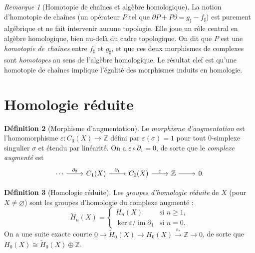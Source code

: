 \documentclass[12pt,a4paper,openany]{book}
\theoremstyle{definition}
\newtheorem{definition}{Définition}[chapter]
\theoremstyle{plain}
\theoremstyle{remark}
\newtheorem{remarque}[definition]{Remarque}
\newcommand{\Z}{\mathbb{Z}}
\DeclareMathOperator{\im}{im}
\begin{document}
\begin{remarque}[Homotopie de chaînes et algèbre homologique]\label{rem:homotopie-algebrique}
La notion d'homotopie de chaînes (un opérateur $P$ tel que $\partial P + P \partial = g_\sharp - f_\sharp$)
est purement algébrique et ne fait intervenir aucune topologie. Elle joue un rôle central en
algèbre homologique, bien au-delà du cadre topologique. On dit que $P$ est une
\emph{homotopie de chaînes} entre $f_\sharp$ et $g_\sharp$, et que ces deux morphismes de
complexes sont \emph{homotopes} au sens de l'algèbre homologique.
Le résultat clef est qu'une homotopie de chaînes implique l'égalité des morphismes induits en
homologie.
\end{remarque}

\section{Homologie réduite}\label{sec:homologie-reduite}

\begin{definition}[Morphisme d'augmentation]\label{def:augmentation}
Le \emph{morphisme d'augmentation} est l'homomorphisme $\varepsilon \colon C_0(X) \to \Z$ défini par
$\varepsilon(\sigma) = 1$ pour tout $0$-simplexe singulier $\sigma$ et étendu par linéarité. On a
$\varepsilon \circ \partial_1 = 0$, de sorte que le \emph{complexe augmenté} est
\[
\begin{tikzcd}
  \cdots \ar[r, "\partial_2"] & C_1(X) \ar[r, "\partial_1"] & C_0(X) \ar[r, "\varepsilon"] & \Z \ar[r] & 0.
\end{tikzcd}
\]
\end{definition}

\begin{definition}[Homologie réduite]\label{def:homologie-reduite}
Les \emph{groupes d'homologie réduite} de $X$ (pour $X \neq \varnothing$) sont les groupes
d'homologie du complexe augmenté :
\[
  \widetilde{H}_n(X) = \begin{cases}
    H_n(X) & \text{si } n \geq 1, \\
    \ker \varepsilon / \im \partial_1 & \text{si } n = 0.
  \end{cases}
\]
On a une suite exacte courte
$0 \to \widetilde{H}_0(X) \to H_0(X) \xrightarrow{\varepsilon_*} \Z \to 0$,
de sorte que $H_0(X) \cong \widetilde{H}_0(X) \oplus \Z$.
\end{definition}
\end{document}
